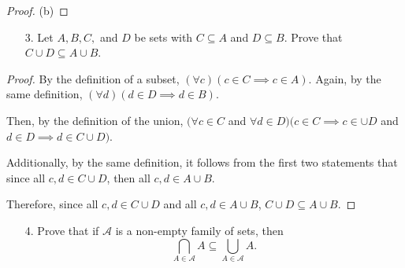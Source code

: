 \documentclass[10pt]{article}
\theoremstyle{definition}
\theoremstyle{plain}
\begin{document}
\begin{proof}{(b)}

\end{proof}



\pagebreak



\begin{enumerate}
  \item[3.] Let $A, B, C,$ and $D$ be sets with $C \subseteq A$ and $D \subseteq B$.  Prove that $C \cup D \subseteq A \cup B$.
\end{enumerate}

\begin{proof}
  By the definition of a subset, $(\forall c)(c\in C \implies c\in A)$. Again, by the same definition, $(\forall d) (d\in D \implies d\in B)$. \\

  \par Then, by the definition of the union, $(\forall c\in C$ and $\forall d\in D)(c\in C \implies c\in \cup D$ and $d\in D \implies d\in C\cup D)$. \\

  \par Additionally, by the same definition, it follows from the first two statements that since all $c,d\in C\cup D$, then all $c,d \in A\cup B$. \\

  \par Therefore, since all $c,d\in C\cup D$ and all $c,d \in A\cup B$, $C\cup D \subseteq A\cup B$.
\end{proof}



\pagebreak



\begin{enumerate}
  \item[4.] Prove that if $\mathcal{A}$ is a non-empty family of sets, then $$\bigcap_{A \in \mathcal{A}}A \subseteq \bigcup_{A \in \mathcal{A}} A.$$
\end{enumerate}
\end{document}
